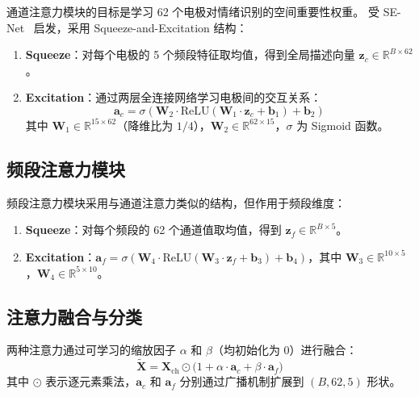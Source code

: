 \documentclass[12pt,a4paper]{ctexart}
\begin{document}
通道注意力模块的目标是学习 62 个电极对情绪识别的空间重要性权重。
受 SE-Net~\cite{senet} 启发，采用 Squeeze-and-Excitation 结构：

\begin{enumerate}[itemsep=0pt]
    \item \textbf{Squeeze}：对每个电极的 5 个频段特征取均值，得到全局描述向量 $\mathbf{z}_c \in \mathbb{R}^{B \times 62}$。
    \item \textbf{Excitation}：通过两层全连接网络学习电极间的交互关系：
    \begin{equation}
        \mathbf{a}_c = \sigma\left(\mathbf{W}_2 \cdot \text{ReLU}(\mathbf{W}_1 \cdot \mathbf{z}_c + \mathbf{b}_1) + \mathbf{b}_2\right)
    \end{equation}
    其中 $\mathbf{W}_1 \in \mathbb{R}^{15 \times 62}$（降维比为 $1/4$），$\mathbf{W}_2 \in \mathbb{R}^{62 \times 15}$，$\sigma$ 为 Sigmoid 函数。
\end{enumerate}

\subsection{频段注意力模块}

频段注意力模块采用与通道注意力类似的结构，但作用于频段维度：

\begin{enumerate}[itemsep=0pt]
    \item \textbf{Squeeze}：对每个频段的 62 个通道值取均值，得到 $\mathbf{z}_f \in \mathbb{R}^{B \times 5}$。
    \item \textbf{Excitation}：$\mathbf{a}_f = \sigma\left(\mathbf{W}_4 \cdot \text{ReLU}(\mathbf{W}_3 \cdot \mathbf{z}_f + \mathbf{b}_3) + \mathbf{b}_4\right)$，其中 $\mathbf{W}_3 \in \mathbb{R}^{10 \times 5}$，$\mathbf{W}_4 \in \mathbb{R}^{5 \times 10}$。
\end{enumerate}

\subsection{注意力融合与分类}

两种注意力通过可学习的缩放因子 $\alpha$ 和 $\beta$（均初始化为 0）进行融合：
\begin{equation}
    \tilde{\mathbf{X}} = \mathbf{X}_{\text{ch}} \odot \big(1 + \alpha \cdot \mathbf{a}_c + \beta \cdot \mathbf{a}_f\big)
\end{equation}
其中 $\odot$ 表示逐元素乘法，$\mathbf{a}_c$ 和 $\mathbf{a}_f$ 分别通过广播机制扩展到 $(B, 62, 5)$ 形状。
\end{document}
